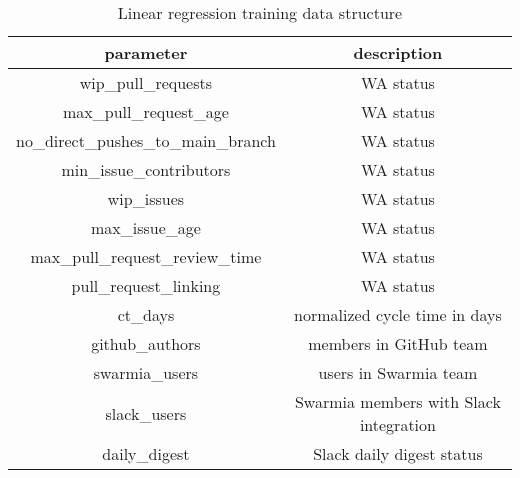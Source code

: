 \begin{table}[h!]
\begin{center}
\begin{tabular}{ |c|c| } 
\hline
parameter & description \\ [0.5ex] 
\hline\hline
wip\_pull\_requests & WA status \\
max\_pull\_request\_age & WA status \\
no\_direct\_pushes\_to\_main\_branch & WA status \\
min\_issue\_contributors  & WA status \\
wip\_issues & WA status \\
max\_issue\_age  & WA status \\
max\_pull\_request\_review\_time  & WA status \\
pull\_request\_linking  & WA status \\
ct\_days  & normalized cycle time in days \\
github\_authors & members in GitHub team \\
swarmia\_users & users in Swarmia team \\
slack\_users & Swarmia members with Slack integration \\
daily\_digest & Slack daily digest status \\
\hline
\end{tabular}
\caption{Linear regression training data structure}
\label{tab:trainingDataStructure}
\end{center}
\end{table}